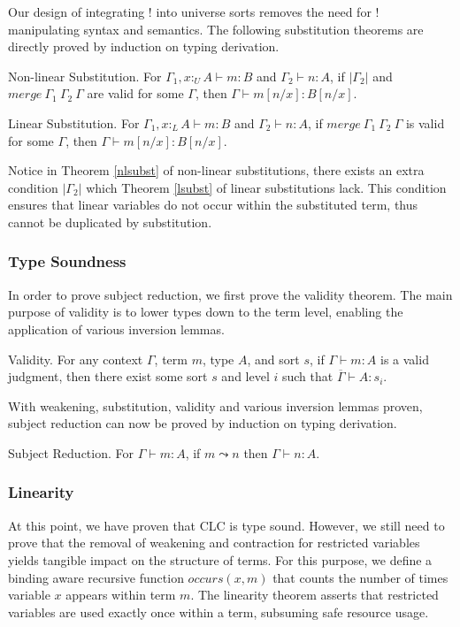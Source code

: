 \documentclass[sigplan,screen,review,anonymous]{acmart}
\newcommand{\pure}[1]{|#1|}
\newcommand{\utype}{:_{\scriptscriptstyle U}}
\newcommand{\ltype}{:_{\scriptscriptstyle L}}
\newcommand{\step}{\leadsto}
\newcommand{\mrg}[3]{merge\ {#1}\ {#2}\ {#3}}
\begin{document}
Our design of integrating ! into universe sorts removes the need for ! manipulating syntax and semantics. The following substitution theorems are directly proved by induction on typing derivation.

\begin{theorem}\label{nlsubst}
  Non-linear Substitution. For $\Gamma_1, x \utype A \vdash m : B$ and $\Gamma_2 \vdash n : A$, if $\pure{\Gamma_2}$ and $\mrg{\Gamma_1}{\Gamma_2}{\Gamma}$ are valid for some $\Gamma$, then $\Gamma \vdash m[n/x] : B[n/x]$.
\end{theorem}

\begin{theorem}\label{lsubst}
  Linear Substitution. For $\Gamma_1, x \ltype A \vdash m : B$ and $\Gamma_2 \vdash n : A$, if $\mrg{\Gamma_1}{\Gamma_2}{\Gamma}$ is valid for some $\Gamma$, then $\Gamma \vdash m[n/x] : B[n/x]$.
\end{theorem}

Notice in Theorem \ref{nlsubst} of non-linear substitutions, there exists an extra condition $\pure{\Gamma_2}$ which Theorem \ref{lsubst} of linear substitutions lack. This condition ensures that linear variables do not occur within the substituted term, thus cannot be duplicated by substitution.

\subsubsection{Type Soundness}
In order to prove subject reduction, we first prove the validity theorem. The main purpose of validity is to lower types down to the term level, enabling the application of various inversion lemmas.

\begin{theorem}
  Validity. For any context $\Gamma$, term $m$, type $A$, and sort $s$, if $\Gamma \vdash m : A$ is a valid judgment, then there exist some sort $s$ and level $i$ such that $\overline{\Gamma} \vdash A : s_i$.
  \label{validity}
\end{theorem}

With weakening, substitution, validity and various inversion lemmas proven, subject reduction can now be proved by induction on typing derivation.

\begin{theorem}
  Subject Reduction. For $\Gamma \vdash m : A$, if $m \step n$ then $\Gamma \vdash n : A$.
\end{theorem}

\subsubsection{Linearity}
At this point, we have proven that CLC is type sound. However, we still need to prove that the removal of weakening and contraction for restricted variables yields tangible impact on the structure of terms. For this purpose, we define a binding aware recursive function $occurs(x, m)$ that counts the number of times variable $x$ appears within term $m$. The linearity theorem asserts that restricted variables are used exactly once within a term, subsuming safe resource usage.
\end{document}
